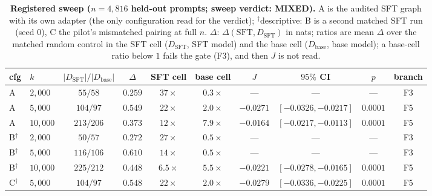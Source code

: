 \documentclass{article}
\begin{document}
\begin{table}[h]
\centering
\small
\setlength{\tabcolsep}{2.8pt}
\caption{\textbf{Registered sweep ($n=4{,}816$ held-out prompts; sweep verdict: \textbf{MIXED}).} A is the audited SFT graph with its own adapter (the only configuration read for the verdict); $^{\dagger}$descriptive: B is a second matched SFT run (seed 0), C the pilot's mismatched pairing at full $n$. $\Delta$: $\Delta(\mathrm{SFT},D_{\mathrm{SFT}})$ in nats; ratios are mean $\Delta$ over the matched random control in the SFT cell ($D_{\mathrm{SFT}}$, SFT model) and the base cell ($D_{\mathrm{base}}$, base model); a base-cell ratio below $1$ fails the gate (F3), and then $J$ is not read.}
\label{tab:functional}
\begin{tabular}{llcccccccc}
\toprule
cfg & $k$ & $|D_{\mathrm{SFT}}|/|D_{\mathrm{base}}|$ & $\Delta$ & SFT cell & base cell & $J$ & $95\%$ CI & $p$ & branch \\
\midrule
A & $2{,}000$ & $55/58$ & $0.259$ & $37\times$ & $0.3\times$ & --- & --- & --- & F3 \\
A & $5{,}000$ & $104/97$ & $0.549$ & $22\times$ & $2.0\times$ & $-0.0271$ & $[-0.0326, -0.0217]$ & $0.0001$ & F5 \\
A & $10{,}000$ & $213/206$ & $0.373$ & $12\times$ & $7.9\times$ & $-0.0164$ & $[-0.0217, -0.0113]$ & $0.0001$ & F5 \\
\midrule
B$^{\dagger}$ & $2{,}000$ & $50/57$ & $0.272$ & $27\times$ & $0.5\times$ & --- & --- & --- & F3 \\
B$^{\dagger}$ & $5{,}000$ & $116/106$ & $0.610$ & $14\times$ & $0.5\times$ & --- & --- & --- & F3 \\
B$^{\dagger}$ & $10{,}000$ & $225/212$ & $0.448$ & $6.5\times$ & $5.5\times$ & $-0.0221$ & $[-0.0278, -0.0165]$ & $0.0001$ & F5 \\
C$^{\dagger}$ & $5{,}000$ & $104/97$ & $0.548$ & $22\times$ & $2.0\times$ & $-0.0279$ & $[-0.0336, -0.0225]$ & $0.0001$ & F5 \\
\bottomrule
\end{tabular}
\end{table}
\end{document}
